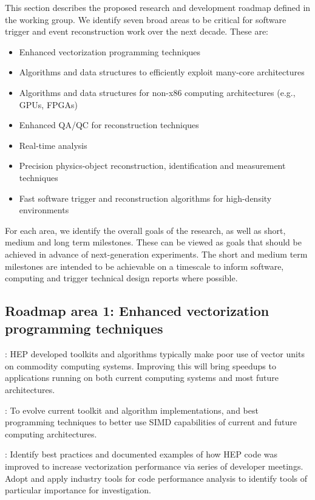 This section describes the proposed research and development roadmap defined in the working group. We identify seven broad areas to be critical for software trigger and event reconstruction work over the next decade. These  are:
\begin{itemize}
\item Enhanced vectorization programming techniques
\item Algorithms and data structures to efficiently exploit many-core architectures
\item Algorithms and data structures for non-x86 computing architectures (e.g., GPUs, FPGAs)
\item Enhanced QA/QC for reconstruction techniques
\item Real-time analysis
\item Precision physics-object reconstruction, identification and measurement techniques
\item Fast software trigger and reconstruction algorithms for high-density environments
\end{itemize}
For each area, we identify the overall goals of the research, as well as short, medium and long term milestones. These can be viewed as goals that should be achieved in advance of next-generation experiments. The short and medium term milestones are intended to be achievable on a timescale to inform software, computing and trigger technical design reports where possible.

\subsection{Roadmap area 1: Enhanced vectorization programming techniques}
: HEP developed toolkits and algorithms typically make poor use of vector units on commodity computing systems. Improving this will bring speedups to applications running on both current computing systems and most future architectures.

: To evolve current toolkit and algorithm implementations, and best programming techniques to better use SIMD capabilities of current and future computing architectures.

\vskip 0.5cm
: Identify best practices and documented examples of how HEP code was improved to increase vectorization performance via series of developer meetings. Adopt and apply industry tools for code performance analysis to identify tools of particular importance for investigation.

